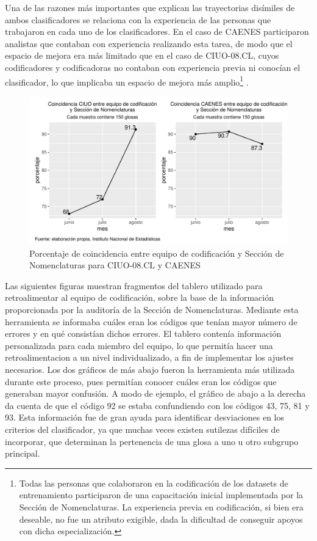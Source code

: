 \documentclass[
  12pt,
  spanish,
]{article}
\begin{document}
Una de las razones más importantes que explican las trayectorias
disímiles de ambos clasificadores se relaciona con la experiencia de las
personas que trabajaron en cada uno de los clasificadores. En el caso de
CAENES participaron analistas que contaban con experiencia realizando
esta tarea, de modo que el espacio de mejora era más limitado que en el
caso de CIUO-08.CL, cuyos codificadores y codificadoras no contaban con
experiencia previa ni conocían el clasificador, lo que implicaba un
espacio de mejora más amplio\footnote{Todas las personas que colaboraron
  en la codificación de los datasets de entrenamiento participaron de
  una capacitación inicial implementada por la Sección de Nomenclaturas.
  La experiencia previa en codificación, si bien era deseable, no fue un
  atributo exigible, dada la dificultad de conseguir apoyos con dicha
  especialización.} .

\begin{figure}[H]
\centering
\large
\caption{Porcentaje de coincidencia entre equipo de codificación y Sección de Nomenclaturas para CIUO-08.CL y CAENES}
\label{div_ic_nac}
\includegraphics[width = \linewidth]{imagenes/auditorias_parciales.pdf}
\normalsize
\end{figure}

Las siguientes figuras muestran fragmentos del tablero utilizado para
retroalimentar al equipo de codificación, sobre la base de la
información proporcionada por la auditoría de la Sección de
Nomenclaturas. Mediante esta herramienta se informaba cuáles eran los
códigos que tenían mayor número de errores y en qué consistían dichos
errores. El tablero contenía información personalizada para cada miembro
del equipo, lo que permitía hacer una retroalimentacion a un nivel
individualizado, a fin de implementar los ajustes necesarios. Los dos
gráficos de más abajo fueron la herramienta más utilizada durante este
proceso, pues permitían conocer cuáles eran los códigos que generaban
mayor confusión. A modo de ejemplo, el gráfico de abajo a la derecha da
cuenta de que el código 92 se estaba confundiendo con los códigos 43,
75, 81 y 93. Esta información fue de gran ayuda para identificar
desviaciones en los criterios del clasificador, ya que muchas veces
existen sutilezas difíciles de incorporar, que determinan la pertenencia
de una glosa a uno u otro subgrupo principal.
\end{document}
